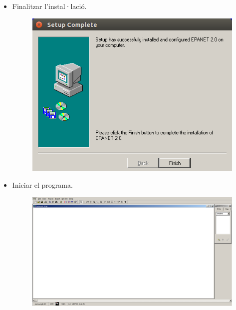 \documentclass[12pt]{article}
\begin{document}
\begin{itemize}
\begin{itemize}
\begin{figure}[h!]
		\end{figure}
		\item Finalitzar l'instal·lació.
		\begin{figure}[h!]
			\centering
			\includegraphics[scale=.3]{imatges/epanet/inst/3.png}
		\end{figure}
		\item Iniciar el programa.
		\begin{figure}[h!]
			\centering
			\includegraphics[scale=.15]{imatges/epanet/inst/4.png}
		\end{figure}
	\end{itemize}
\end{itemize}
\end{document}
